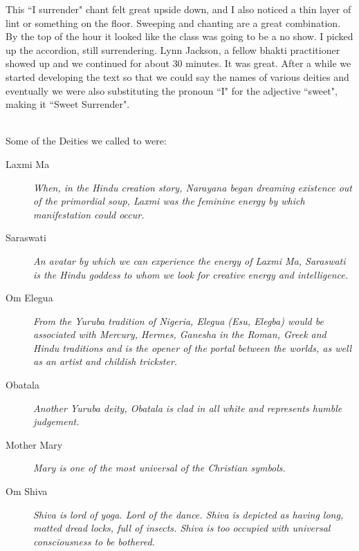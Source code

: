 \documentclass[a5paper,twoside,9pt]{extbook}
\newtheorem{I Surrender}{Definition}
\begin{document}
This ``I surrender" chant felt great upside down, and I also noticed a thin layer of lint or something on the floor. Sweeping and chanting are a great combination. By the top of the hour it looked like the class was going to be a no show. I picked up the accordion, still surrendering. Lynn Jackson, a fellow bhakti practitioner showed up and we continued for about 30 minutes. It was great. After a while we started developing the text so that we could say the names of various deities and eventually we were also substituting the pronoun ``I" for the adjective ``sweet", making it ``Sweet Surrender".


\begin{quote}
{%
\parindent 0pt
\noindent
\ifx\preLilyPondExample \undefined
\else
  \expandafter\preLilyPondExample
\fi
\def\lilypondbook{}%

\ifx\postLilyPondExample \undefined
\else
  \expandafter\postLilyPondExample
\fi
}
\end{quote}

\hfill \\

Some of the Deities we called to were: \hfill \\

\begin{addmargin}[3em]{3em}
\begin{description}

\item[Laxmi Ma]
\textit{When, in the Hindu creation story, Narayana began dreaming existence out of the primordial soup, Laxmi was the feminine energy by which manifestation could occur.}

\item[Saraswati]
\textit{An avatar by which we can experience the energy of Laxmi Ma, Saraswati is the Hindu goddess to whom we look for creative energy and intelligence.}

\item[Om Elegua]
\textit{From the Yuruba tradition of Nigeria, Elegua (Esu, Elegba) would be associated with Mercury, Hermes, Ganesha in the Roman, Greek and Hindu traditions and is the opener of the portal between the worlds, as well as an artist and childish trickster.}

\item[Obatala]
\textit{Another Yuruba deity, Obatala is clad in all white and represents humble judgement.}

\item[Mother Mary]
\textit{Mary is one of the most universal of the Christian symbols.}

\item[Om Shiva]
\textit{Shiva is lord of yoga. Lord of the dance. Shiva is depicted as having long, matted dread locks, full of insects. Shiva is too occupied with universal consciousness to be bothered.}
\end{description}
\end{addmargin}
\hfill \\
\end{document}
